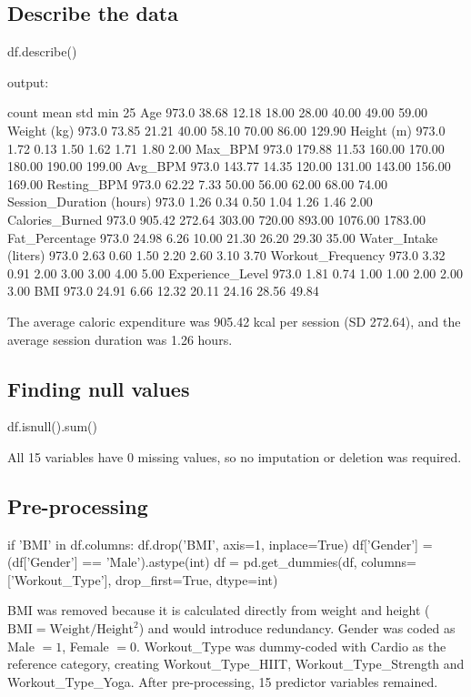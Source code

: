 \documentclass[12pt,a4paper]{report}
\begin{document}
\subsection{Describe the data}
\begin{code}
df.describe()
\end{code}
output:
\begin{out}
                           count    mean     std     min     25%
Age                        973.0   38.68   12.18   18.00   28.00   40.00    49.00    59.00
Weight (kg)                973.0   73.85   21.21   40.00   58.10   70.00    86.00   129.90
Height (m)                 973.0    1.72    0.13    1.50    1.62    1.71     1.80     2.00
Max_BPM                    973.0  179.88   11.53  160.00  170.00  180.00   190.00   199.00
Avg_BPM                    973.0  143.77   14.35  120.00  131.00  143.00   156.00   169.00
Resting_BPM                973.0   62.22    7.33   50.00   56.00   62.00    68.00    74.00
Session_Duration (hours)   973.0    1.26    0.34    0.50    1.04    1.26     1.46     2.00
Calories_Burned            973.0  905.42  272.64  303.00  720.00  893.00  1076.00  1783.00
Fat_Percentage             973.0   24.98    6.26   10.00   21.30   26.20    29.30    35.00
Water_Intake (liters)      973.0    2.63    0.60    1.50    2.20    2.60     3.10     3.70
Workout_Frequency          973.0    3.32    0.91    2.00    3.00    3.00     4.00     5.00
Experience_Level           973.0    1.81    0.74    1.00    1.00    2.00     2.00     3.00
BMI                        973.0   24.91    6.66   12.32   20.11   24.16    28.56    49.84
\end{out}
The average caloric expenditure was 905.42 kcal per session (SD 272.64), and the average session duration was 1.26 hours.

\subsection{Finding null values}
\begin{code}
df.isnull().sum()
\end{code}
All 15 variables have 0 missing values, so no imputation or deletion was required.

\subsection{Pre-processing}
\begin{code}
if 'BMI' in df.columns:
    df.drop('BMI', axis=1, inplace=True)
df['Gender'] = (df['Gender'] == 'Male').astype(int)
df = pd.get_dummies(df, columns=['Workout_Type'], drop_first=True, dtype=int)
\end{code}
BMI was removed because it is calculated directly from weight and height ($\text{BMI} = \text{Weight}/\text{Height}^2$) and would introduce redundancy. Gender was coded as Male $=1$, Female $=0$. Workout\_Type was dummy-coded with Cardio as the reference category, creating Workout\_Type\_HIIT, Workout\_Type\_Strength and Workout\_Type\_Yoga. After pre-processing, 15 predictor variables remained.
\end{document}

